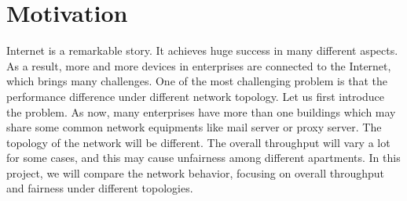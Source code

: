 \section{Motivation} \label{sec:motivation}

Internet is a remarkable story. It achieves huge success in many different aspects. 
As a result, more and more devices in enterprises are connected to the Internet, which brings many challenges.
One of the most challenging problem is that the performance difference under different network topology.
Let us first introduce the problem. 
As now, many enterprises have more than one buildings which may share some common network equipments like mail server or proxy server.
The topology of the network will be different. The overall throughput will vary a lot for some cases, 
and this may cause unfairness among different apartments.
In this project, we will compare the network behavior, focusing on overall throughput and fairness under different topologies.